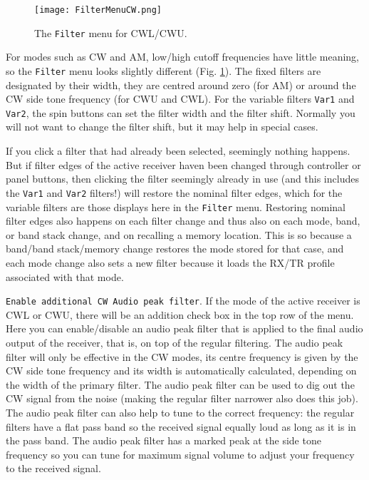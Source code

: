 \documentclass[12pt]{book}
\def\rett#1{\texttt{\color{red}#1}}
\def\bltt#1{\texttt{\color{blue}#1}}
\begin{document}
\begin{figure}[ht]
\center
\texttt{[image: FilterMenuCW.png]}
\caption{The \bltt{Filter} menu for CWL/CWU.}
\label{fig:FilterMenuCW}
\end{figure}

For modes such as CW and AM, low/high cutoff frequencies have little meaning, so the
\bltt{Filter} menu looks slightly different (Fig. \ref{fig:FilterMenuCW}). The fixed
filters are designated by their width, they are centred around zero (for AM) or around
the CW side tone frequency (for CWU and CWL). For the variable filters \texttt{Var1}
and \texttt{Var2},
the spin buttons can set the filter width and the filter shift. Normally you will not
want to change the filter shift, but it may help in special cases.

If you click a filter that had already been selected, seemingly nothing happens.
But if filter edges of the active receiver haven been changed through
controller or panel buttons, then clicking the filter seemingly already in use
(and this includes the \texttt{Var1} and \texttt{Var2} filters!)
will restore the nominal filter edges, which for the variable filters are those
displays here in the \bltt{Filter} menu.
Restoring nominal filter edges also happens on each filter change and thus
also on each  mode, band, or band stack change, and on recalling a memory
location. This is so because a band/band stack/memory change restores
the mode stored for that case, and each mode change also sets a new filter
because it loads the RX/TR profile associated with that mode.

\rett{Enable additional CW Audio peak filter}. If the mode of the
active receiver is CWL or CWU, there will be an addition check box in the
top row of the menu. Here you can enable/disable an audio peak filter that
is applied to the final audio output of the receiver, that is, on top of
the regular filtering. The audio peak filter will only be effective in
the CW modes, its centre frequency is given by the CW side tone frequency
and its width is automatically calculated, depending on the
width of the primary filter. The audio peak filter can be used to dig out
the CW signal from the noise (making the regular filter narrower also
does this job). The audio peak filter can also help to tune to the correct
frequency: the regular filters have a flat pass band so the received
signal equally loud as long as it is in the pass band. The audio peak filter
has a marked peak at the side tone frequency so you can tune for maximum
signal volume to adjust your frequency to the received signal.
\end{document}
